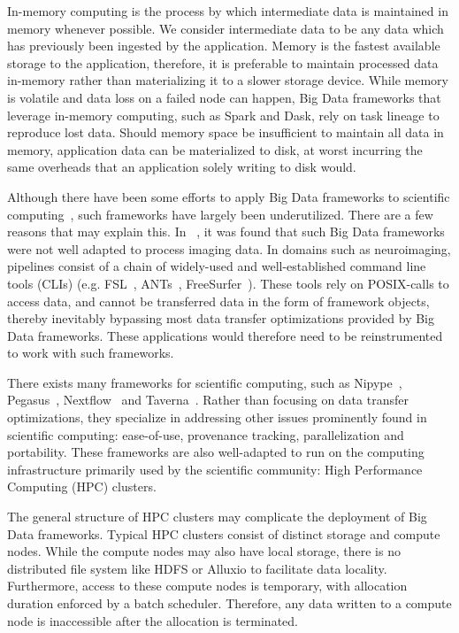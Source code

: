 \documentclass{report}
\begin{document}
    In-memory computing is the process by which intermediate data is maintained in memory whenever possible.
    We consider intermediate data to be any data which has previously been ingested by the application.
    Memory is the fastest available storage to the application, therefore, it is preferable to maintain 
    processed data in-memory rather than materializing it to a slower storage device. While memory is
    volatile and data loss on a failed node can happen, Big Data frameworks that leverage in-memory
    computing, such as Spark and Dask, rely on task lineage to reproduce lost data. Should memory
    space be insufficient to maintain all data in memory, application data can be materialized to
    disk, at worst incurring the same overheads that an application solely writing to disk
    would.

    Although there have been some efforts to apply Big Data frameworks to scientific
    computing~\cite{kira, thunder}, such frameworks have largely been underutilized.
    There are a few reasons that may explain this. In ~\cite{mehta2017}, it was found
    that such Big Data frameworks were not well adapted to process imaging data.
    In domains such as neuroimaging, pipelines consist of a chain of widely-used and well-established
    command line tools (CLIs) (e.g. FSL~\cite{fsl}, ANTs~\cite{ants}, FreeSurfer~\cite{freesurfer}).
    These tools rely on POSIX-calls to access data, and cannot be transferred data in the
    form of framework objects, thereby inevitably bypassing most data transfer optimizations
    provided by Big Data frameworks. These applications would therefore need to be reinstrumented
    to work with such frameworks.

    There exists many frameworks for scientific computing,
    such as Nipype~\cite{nipype}, Pegasus~\cite{pegasus}, Nextflow~\cite{nextflow} and Taverna~\cite{taverna}.
    Rather than focusing on data transfer optimizations, they specialize in addressing
    other issues prominently found in scientific computing: ease-of-use, provenance
    tracking, parallelization and portability. These frameworks are also well-adapted to
    run on the computing infrastructure primarily used by the scientific community:
    High Performance Computing (HPC) clusters.


    The general structure of HPC clusters may complicate the deployment of Big Data frameworks.
    Typical HPC clusters consist of distinct storage and compute nodes. While the compute
    nodes may also have local storage, there is no distributed file system like HDFS or
    Alluxio to facilitate data locality. Furthermore, access to these compute nodes is
    temporary, with allocation duration enforced by a batch scheduler. Therefore, any
    data written to a compute node is inaccessible after the allocation is terminated.
\end{document}
